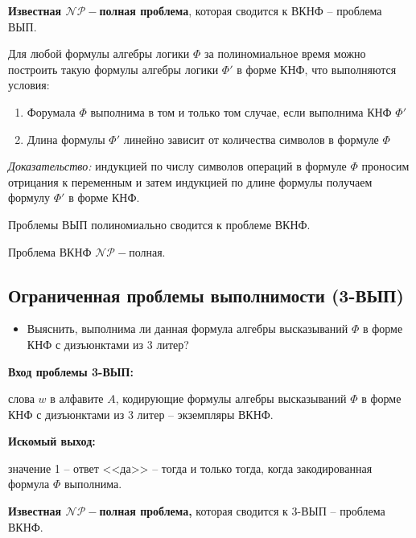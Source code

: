 \textbf{Известная $\mathscr{NP-}$полная проблема}, которая сводится к ВКНФ -- проблема ВЫП.

\begin{theorem}
    Для любой формулы алгебры логики $\Phi$ за полиномиальное время можно построить такую формулы алгебры логики $\Phi'$ в форме КНФ, что выполняются условия:
    \begin{enumerate}
        \item Форумала $\Phi$ выполнима в том и только том случае, если выполнима КНФ $\Phi'$
        \item Длина формулы $\Phi'$ линейно зависит от количества символов в формуле $\Phi$
    \end{enumerate}
\end{theorem}

\textit{Доказательство:} индукцией по числу символов операций в формуле $\Phi$ проносим отрицания к переменным и затем индукцией по длине формулы получаем формулу $\Phi'$ в форме КНФ.

\begin{theorem}
    Проблемы ВЫП полиномиально сводится к проблеме ВКНФ.
\end{theorem}

\begin{corollary}
    Проблема ВКНФ $\mathscr{NP-}$полная.
\end{corollary}

\subsection*{Ограниченная проблемы выполнимости (3-ВЫП)}

\begin{itemize}
    \item Выяснить, выполнима ли данная формула алгебры высказываний $\Phi$ в форме КНФ с дизъюнктами из 3 литер?
\end{itemize}

\textbf{Вход проблемы 3-ВЫП:}

слова $w$ в алфавите $A$, кодирующие формулы алгебры высказываний $\Phi$ в форме КНФ с дизъюнктами из 3 литер -- экземпляры ВКНФ.

\textbf{Искомый выход:}

значение 1 -- ответ <<да>> -- тогда и только тогда, когда закодированная формула $\Phi$ выполнима.

\textbf{Известная $\mathscr{NP-}$полная проблема,} которая сводится к 3-ВЫП -- проблема ВКНФ.


